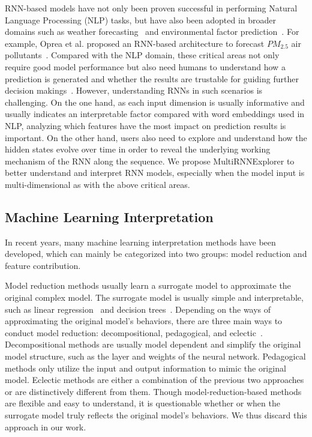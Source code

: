 RNN-based models have not only been proven successful in performing Natural Language Processing (NLP) tasks, but have also been adopted in broader domains such as weather forecasting~\cite{xingjian2015convolutional} and environmental factor prediction~\cite{chen2018applications}.
For example, Oprea et al. proposed an RNN-based architecture to forecast $PM_{2.5}$ air pollutants~\cite{oprea2016neural}.
Compared with the NLP domain, these critical areas not only require good model performance but also need humans to understand how a prediction is generated and whether the results are trustable for guiding further decision makings~\cite{lipton2017doctor}.
However, understanding RNNs in such scenarios is challenging.
On the one hand, as each input dimension is usually informative and usually indicates an interpretable factor compared with word embeddings used in NLP, analyzing which features have the most impact on prediction results is important.
On the other hand, users also need to explore and understand how the hidden states evolve over time in order to reveal the underlying working mechanism of the RNN along the sequence.
We propose MultiRNNExplorer to better understand and interpret RNN models, especially when the model input is multi-dimensional as with the above critical areas.

\subsection{Machine Learning Interpretation}
\label{sec:mlinter}
In recent years, many machine learning interpretation methods have been developed, which can mainly be categorized into two groups: model reduction and feature contribution.

Model reduction methods usually learn a surrogate model to approximate the original complex model.
The surrogate model is usually simple and interpretable, such as linear regression~\cite{ribeiro2016should} and decision trees~\cite{craven1996extracting}. 
Depending on the ways of approximating the original model's behaviors, there are three main ways to conduct model reduction: decompositional, pedagogical, and eclectic~\cite{andrews1995survey}.
Decompositional methods are usually model dependent and simplify the original model structure, such as the layer and weights of the neural network.
Pedagogical methods only utilize the input and output information to mimic the original model.
Eclectic methods are either a combination of the previous two approaches or are distinctively different from them.
Though model-reduction-based methods are flexible and easy to understand, it is questionable whether or when the surrogate model truly reflects the original model's behaviors.
We thus discard this approach in our work.

